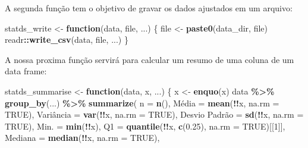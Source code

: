 \documentclass[
]{latex/krantz}
\newenvironment{Shaded}{\begin{snugshade}}{\end{snugshade}}
\newcommand{\AttributeTok}[1]{\textcolor[rgb]{0.13,0.29,0.53}{#1}}
\newcommand{\ConstantTok}[1]{\textcolor[rgb]{0.56,0.35,0.01}{#1}}
\newcommand{\ControlFlowTok}[1]{\textcolor[rgb]{0.13,0.29,0.53}{\textbf{#1}}}
\newcommand{\DecValTok}[1]{\textcolor[rgb]{0.00,0.00,0.81}{#1}}
\newcommand{\FloatTok}[1]{\textcolor[rgb]{0.00,0.00,0.81}{#1}}
\newcommand{\FunctionTok}[1]{\textcolor[rgb]{0.13,0.29,0.53}{\textbf{#1}}}
\newcommand{\NormalTok}[1]{#1}
\newcommand{\OtherTok}[1]{\textcolor[rgb]{0.56,0.35,0.01}{#1}}
\newcommand{\SpecialCharTok}[1]{\textcolor[rgb]{0.81,0.36,0.00}{\textbf{#1}}}
\newcommand{\StringTok}[1]{\textcolor[rgb]{0.31,0.60,0.02}{#1}}
\theoremstyle{definition}
\theoremstyle{definition}
\theoremstyle{definition}
\theoremstyle{definition}
\theoremstyle{remark}
\begin{document}
A segunda função tem o objetivo de gravar os dados ajustados em um arquivo:

\begin{Shaded}
\begin{Highlighting}[]
\NormalTok{statds\_write }\OtherTok{\textless{}{-}} \ControlFlowTok{function}\NormalTok{(data, file, ...) \{}
\NormalTok{  file }\OtherTok{\textless{}{-}} \FunctionTok{paste0}\NormalTok{(data\_dir, file)}
\NormalTok{  readr}\SpecialCharTok{::}\FunctionTok{write\_csv}\NormalTok{(data, file, ...)}
\NormalTok{\}}
\end{Highlighting}
\end{Shaded}

A nossa proxima função servirá para calcular um resumo de uma coluna de um data frame:

\begin{Shaded}
\begin{Highlighting}[]
\NormalTok{statds\_summarise }\OtherTok{\textless{}{-}} \ControlFlowTok{function}\NormalTok{(data, x, ...) \{}
\NormalTok{  x }\OtherTok{\textless{}{-}} \FunctionTok{enquo}\NormalTok{(x)}
\NormalTok{  data }\SpecialCharTok{\%\textgreater{}\%} 
    \FunctionTok{group\_by}\NormalTok{(...) }\SpecialCharTok{\%\textgreater{}\%}
    \FunctionTok{summarize}\NormalTok{(}
        \StringTok{\textasciigrave{}}\AttributeTok{n}\StringTok{\textasciigrave{}} \OtherTok{=} \FunctionTok{n}\NormalTok{(),}
        \StringTok{\textasciigrave{}}\AttributeTok{Média}\StringTok{\textasciigrave{}} \OtherTok{=} \FunctionTok{mean}\NormalTok{(}\SpecialCharTok{!!}\NormalTok{x, }\AttributeTok{na.rm =} \ConstantTok{TRUE}\NormalTok{), }
        \StringTok{\textasciigrave{}}\AttributeTok{Variância}\StringTok{\textasciigrave{}} \OtherTok{=} \FunctionTok{var}\NormalTok{(}\SpecialCharTok{!!}\NormalTok{x, }\AttributeTok{na.rm =} \ConstantTok{TRUE}\NormalTok{),}
        \StringTok{\textasciigrave{}}\AttributeTok{Desvio Padrão}\StringTok{\textasciigrave{}} \OtherTok{=} \FunctionTok{sd}\NormalTok{(}\SpecialCharTok{!!}\NormalTok{x, }\AttributeTok{na.rm =} \ConstantTok{TRUE}\NormalTok{),}
        \StringTok{\textasciigrave{}}\AttributeTok{Min.}\StringTok{\textasciigrave{}} \OtherTok{=} \FunctionTok{min}\NormalTok{(}\SpecialCharTok{!!}\NormalTok{x),}
        \StringTok{\textasciigrave{}}\AttributeTok{Q1}\StringTok{\textasciigrave{}} \OtherTok{=} \FunctionTok{quantile}\NormalTok{(}\SpecialCharTok{!!}\NormalTok{x, }\FunctionTok{c}\NormalTok{(}\FloatTok{0.25}\NormalTok{), }\AttributeTok{na.rm =} \ConstantTok{TRUE}\NormalTok{)[[}\DecValTok{1}\NormalTok{]],}
        \StringTok{\textasciigrave{}}\AttributeTok{Mediana}\StringTok{\textasciigrave{}} \OtherTok{=} \FunctionTok{median}\NormalTok{(}\SpecialCharTok{!!}\NormalTok{x, }\AttributeTok{na.rm =} \ConstantTok{TRUE}\NormalTok{),}

\end{Highlighting}
\end{Shaded}
\end{document}
